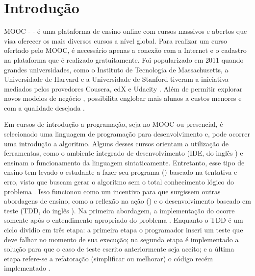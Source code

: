 \chapter{Introdução}

	MOOC -  - é uma plataforma de ensino online
	com cursos massivos e abertos que visa oferecer os mais diversos cursos a nível
	global.	Para realizar um curso ofertado pelo MOOC, é necessário	apenas a conexão
	com a Internet e o cadastro na plataforma que é realizado gratuitamente. Foi
	popularizado em 2011 quando grandes universidades, como o Instituto de Tecnologia
	de Massachusetts, a Universidade de Harvard e a Universidade de Stanford tiveram
	a iniciativa mediados pelos provedores Cousera, edX e Udacity \cite{Mehlenbacher:2012}.
	Além de permitir explorar novos modelos de negócio \cite{dellarocas2013money},
	possibilita englobar mais alunos a custos menores e com a qualidade desejada
	\cite{schmidt2013producing}.
	
	Em cursos de introdução a programação, seja no MOOC ou presencial, é selecionado
	uma linguagem de programação para desenvolvimento e, pode ocorrer uma introdução
	a algoritmo. Alguns desses cursos orientam a utilização de ferramentas, como o
	ambiente integrado de desenvolvimento (IDE, do inglês ) e ensinam o funcionamento da linguagem sintaticamente.
	Entretanto, esse tipo de ensino tem levado o estudante a fazer seu programa
	() baseado na tentativa e erro, visto que buscam gerar o
	algoritmo sem o total conhecimento lógico do problema \cite{edwards2003}. Isso funcionou como um incentivo para que surgissem outras abordagens de ensino, como a reflexão na ação () e o desenvolvimento baseado em teste (TDD, do inglês ). Na primeira abordagem, a implementação do  ocorre somente após o entendimento apropriado do problema \cite{edwards2004}. Enquanto o TDD é um ciclo dividio em três etapa: a primeira etapa o programador inseri um teste que deve falhar no momento de sua execução; na segunda etapa é implementado a solução para que o caso de teste escrito anteriormente seja aceito; e a última etapa refere-se a refatoração (simplificar ou melhorar) o código recém implementado \cite{beck2003}.
	

